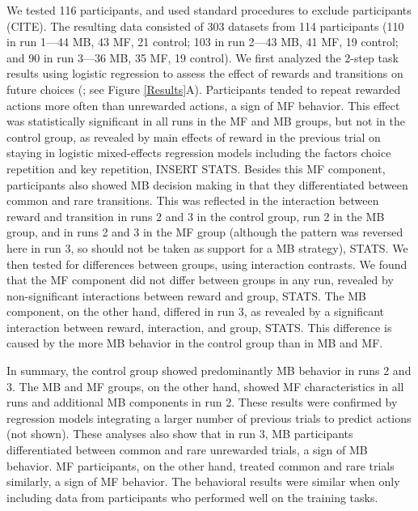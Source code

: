 \documentclass[11pt]{article} %
\begin{document}
We tested 116 participants, and used standard procedures to exclude participants (CITE). The resulting data consisted of 303 datasets from 114 participants (110 in run 1---44 MB, 43 MF, 21 control; 103 in run 2---43 MB, 41 MF, 19 control; and 90 in run 3---36 MB, 35 MF, 19 control). We first analyzed the 2-step task results using logistic regression to assess the effect of rewards and transitions on future choices (\cite{akam_simple_2015}; see Figure \ref{Results}A). Participants tended to repeat rewarded actions more often than unrewarded actions, a sign of MF behavior. This effect was statistically significant in all runs in the MF and MB groups, but not in the control group, as revealed by main effects of reward in the previous trial on staying in logistic mixed-effects regression models including the factors choice repetition and key repetition, INSERT STATS. Besides this MF component, participants also showed MB decision making in that they differentiated between common and rare transitions. This was reflected in the interaction between reward and transition in runs 2 and 3 in the control group, run 2 in the MB group, and in runs 2 and 3 in the MF group (although the pattern was reversed here in run 3, so should not be taken as support for a MB strategy), STATS. We then tested for differences between groups, using interaction contrasts. We found that the MF component did not differ between groups in any run, revealed by non-significant interactions between reward and group, STATS. The MB component, on the other hand, differed in run 3, as revealed by a significant interaction between reward, interaction, and group, STATS. This difference is caused by the more MB behavior in the control group than in MB and MF.

In summary, the control group showed predominantly MB behavior in runs 2 and 3. The MB and MF groups, on the other hand, showed MF characteristics in all runs and additional MB components in run 2. These results were confirmed by regression models integrating a larger number of previous trials to predict actions (not shown). These analyses also show that in run 3, MB participants differentiated between common and rare unrewarded trials, a sign of MB behavior. MF participants, on the other hand, treated common and rare trials similarly, a sign of MF behavior. The behavioral results were similar when only including data from participants who performed well on the training tasks.
\end{document}

